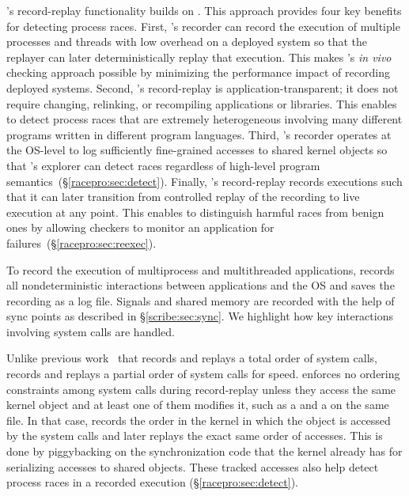 \racepro's record-replay functionality builds on \scribe.
This approach provides four key
benefits for detecting process races.  First, \racepro's recorder can 
record the execution of multiple processes and threads with low overhead
on a deployed system so that the replayer can later deterministically
replay that execution.  This makes \racepro's \emph{in vivo} checking approach
possible by minimizing the performance impact of recording deployed
systems.  Second, \racepro's record-replay is application-transparent; it
does not require changing, relinking, or recompiling applications or
libraries. This enables \racepro to detect process races that are
extremely heterogeneous involving many different programs written in
different program languages.  Third, \racepro's recorder operates at the
OS-level to log sufficiently fine-grained accesses to shared kernel
objects so that \racepro's explorer can detect races regardless of
high-level program semantics~(\S\ref{racepro:sec:detect}).  Finally, \racepro's
record-replay records executions such that it can later transition 
from controlled replay of the recording to live execution at any
point.  This enables \racepro to distinguish harmful races from benign
ones by allowing checkers to monitor an application for
failures~(\S\ref{racepro:sec:reexec}). 

To record the execution of multiprocess and multithreaded
applications, \racepro records all nondeterministic interactions between
applications and the OS and saves the recording as a log file.
Signals and shared memory are recorded with the help of sync points
as described in \S\ref{scribe:sec:sync}.
We highlight how key interactions involving system calls are handled.

Unlike previous
work~\cite{r2:osdi,srinivasan:flashback} that records and replays a total
order of system calls, \racepro records and replays a partial order of system
calls for speed.  \racepro enforces no ordering constraints among system
calls during record-replay unless they access the same kernel object
and at least one of them modifies it, such as a  and a
 on the same file.  In that case, \racepro records the order in
the kernel in which the object is accessed by the system calls and
later replays the exact same order of accesses.  This is done by 
piggybacking on the synchronization code that the kernel already has
for serializing accesses to shared objects.  These tracked accesses
also help detect process races in a recorded execution
(\S\ref{racepro:sec:detect}). 


